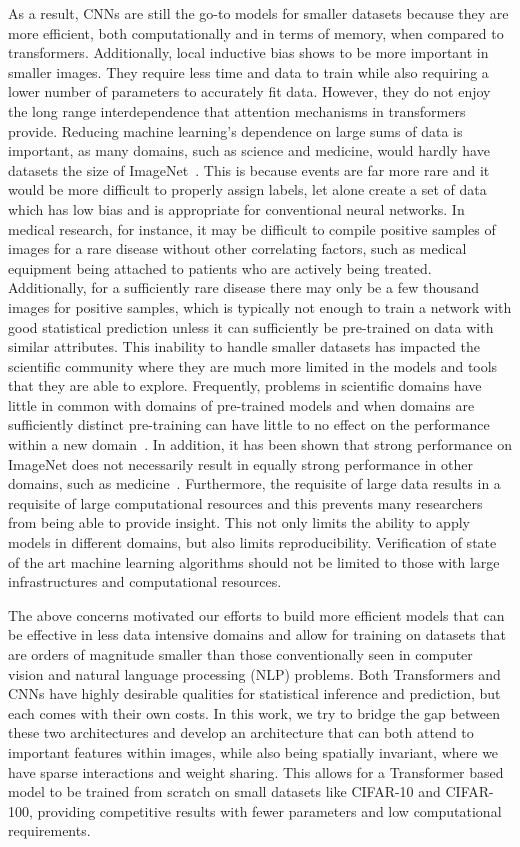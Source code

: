\documentclass[10pt,twocolumn,letterpaper]{article}
\begin{document}
As a result, CNNs are still the go-to models for smaller datasets because they are more efficient, both computationally and in terms of memory, when compared to transformers.
Additionally, local inductive bias shows to be more important in smaller images.
They require less time and data to train while also requiring a lower number of parameters to accurately fit data.
However, they do not enjoy the long range interdependence that attention mechanisms in transformers provide.
Reducing machine learning's dependence on large sums of data is important, as many domains, such as science and medicine, would hardly have datasets the size of ImageNet~\cite{deng2009imagenet}.
This is because events are far more rare and it would be more difficult to properly assign labels, let alone create a set of data which has low bias and is appropriate for conventional neural networks.
In medical research, for instance, it may be difficult to compile positive samples of images for a rare disease without other correlating factors, such as medical equipment being attached to patients who are actively being treated.
Additionally, for a sufficiently rare disease there may only be a few thousand images for positive samples, which is typically not enough to train a network with good statistical prediction unless it can sufficiently be pre-trained on data with similar attributes.
This inability to handle smaller datasets has impacted the scientific community where they are much more limited in the models and tools that they are able to explore.
Frequently, problems in scientific domains have little in common with domains of pre-trained models and when domains are sufficiently distinct pre-training can have little to no effect on the performance within a new domain~\cite{zhuang2019a}.
In addition, it has been shown that strong performance on ImageNet does not necessarily result in equally strong performance in other domains, such as medicine~\cite{ke2021chextransfer}.
Furthermore, the requisite of large data results in a requisite of large computational resources and this prevents many researchers from being able to provide insight.
This not only limits the ability to apply models in different domains, but also limits reproducibility.
Verification of state of the art machine learning algorithms should not be limited to those with large infrastructures and computational resources.

The above concerns motivated our efforts to build more efficient models that can be effective in less data intensive domains and allow for training on datasets that are orders of magnitude smaller than those conventionally seen in computer vision and natural language processing (NLP) problems.
Both Transformers and CNNs have highly desirable qualities for statistical inference and prediction, but each comes with their own costs. In this work, we try to bridge the gap between these two architectures and develop an architecture that can both attend to important features within images, while also being spatially invariant, where we have sparse interactions and weight sharing.
This allows for a Transformer based model to be trained from scratch on small datasets like CIFAR-10 and CIFAR-100, providing competitive results with fewer parameters and low computational requirements.
\end{document}
